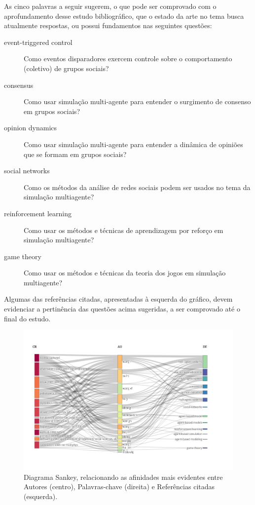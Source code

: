 As cinco palavras a seguir sugerem, o que pode ser comprovado com o aprofundamento desse estudo bibliográfico, que o estado da arte no tema busca atualmente respostas, ou possui fundamentos nas seguintes questões:
\begin{description}
    \item [event-triggered control] Como eventos disparadores exercem  controle sobre o comportamento (coletivo) de grupos sociais?
    \item [consensus] Como usar simulação multi-agente para entender o surgimento de consenso em grupos sociais?
    \item [opinion dynamics] Como usar simulação multi-agente para entender a dinâmica de opiniões que se formam em grupos sociais?
    \item [social networks] Como os métodos da análise de redes sociais podem ser usados no tema da simulação multiagente?
    \item [reinforcement learning] Como usar os métodos e técnicas de aprendizagem por reforço em simulação multiagente?
    \item [game theory] Como usar os métodos e técnicas da teoria dos jogos em simulação multiagente?
\end{description}

Algumas das referências citadas, apresentadas à esquerda do gráfico, devem evidenciar a pertinência das questões acima sugeridas, a ser comprovado até o final do estudo. 

\begin{figure}
    \centering
    \includegraphics[angle=90,width=1\textwidth,height=0.9\textheight]{experiments/jhcf/PesqBibliogr/SimulacaoMultiagente/WoS-20220203/Descritiva/MASSA2-Three-Fields-Plot-CR-AU-DE.png}
    \caption{Diagrama Sankey, relacionando as afinidades mais evidentes entre Autores (centro), Palavras-chave (direita) e Referências citadas (esquerda).}
    \label{fig:MASSA2:Sankey:CR-AU-DE}
\end{figure}

